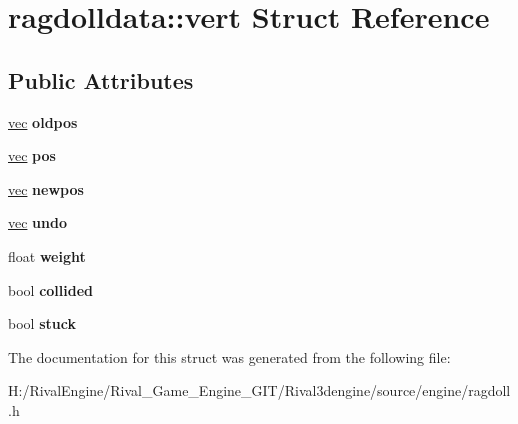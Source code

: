 \hypertarget{structragdolldata_1_1vert}{}\section{ragdolldata\+:\+:vert Struct Reference}
\label{structragdolldata_1_1vert}
\subsection*{Public Attributes}
\begin{DoxyCompactItemize}
\item 
\mbox{\label{structragdolldata_1_1vert_a8e7892a75e0b310488fb9fa2967767a0}} 
\hyperlink{structvec}{vec} {\bfseries oldpos}
\item 
\mbox{\label{structragdolldata_1_1vert_acf689085cc1c3a306cec0dc7e9b0a8b3}} 
\hyperlink{structvec}{vec} {\bfseries pos}
\item 
\mbox{\label{structragdolldata_1_1vert_a97c7981917a355b6fcb3b6beadfb9f90}} 
\hyperlink{structvec}{vec} {\bfseries newpos}
\item 
\mbox{\label{structragdolldata_1_1vert_afc8d81cc5ffaa8185ab3a9fc42c9cc78}} 
\hyperlink{structvec}{vec} {\bfseries undo}
\item 
\mbox{\label{structragdolldata_1_1vert_acbf5a66058a97505cf22983aedf9b39c}} 
float {\bfseries weight}
\item 
\mbox{\label{structragdolldata_1_1vert_ac2d4a6a50eabc6b67219fcc9f13995a7}} 
bool {\bfseries collided}
\item 
\mbox{\label{structragdolldata_1_1vert_aaa07cfe3f936124ec3d1d4f47cd47494}} 
bool {\bfseries stuck}
\end{DoxyCompactItemize}


The documentation for this struct was generated from the following file\+:\begin{DoxyCompactItemize}
\item 
H\+:/\+Rival\+Engine/\+Rival\+\_\+\+Game\+\_\+\+Engine\+\_\+\+G\+I\+T/\+Rival3dengine/source/engine/ragdoll.\+h\end{DoxyCompactItemize}
